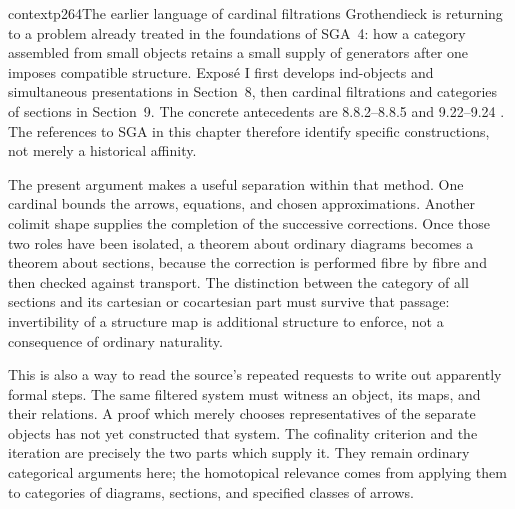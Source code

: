 \begin{dcomment}{context}{p264}{The earlier language of cardinal filtrations}
Grothendieck is returning to a problem already treated in the foundations of SGA~4: how a category assembled from small objects retains a small supply of generators after one imposes compatible structure. Expos\'e I first develops ind-objects and simultaneous presentations in Section~8, then cardinal filtrations and categories of sections in Section~9. The concrete antecedents are 8.8.2--8.8.5 and 9.22--9.24 \citep{SGA4I1972}. The references to SGA in this chapter therefore identify specific constructions, not merely a historical affinity.

The present argument makes a useful separation within that method. One cardinal bounds the arrows, equations, and chosen approximations. Another colimit shape supplies the completion of the successive corrections. Once those two roles have been isolated, a theorem about ordinary diagrams becomes a theorem about sections, because the correction is performed fibre by fibre and then checked against transport. The distinction between the category of all sections and its cartesian or cocartesian part must survive that passage: invertibility of a structure map is additional structure to enforce, not a consequence of ordinary naturality.

This is also a way to read the source's repeated requests to write out apparently formal steps. The same filtered system must witness an object, its maps, and their relations. A proof which merely chooses representatives of the separate objects has not yet constructed that system. The cofinality criterion and the iteration are precisely the two parts which supply it. They remain ordinary categorical arguments here; the homotopical relevance comes from applying them to categories of diagrams, sections, and specified classes of arrows.
\end{dcomment}

